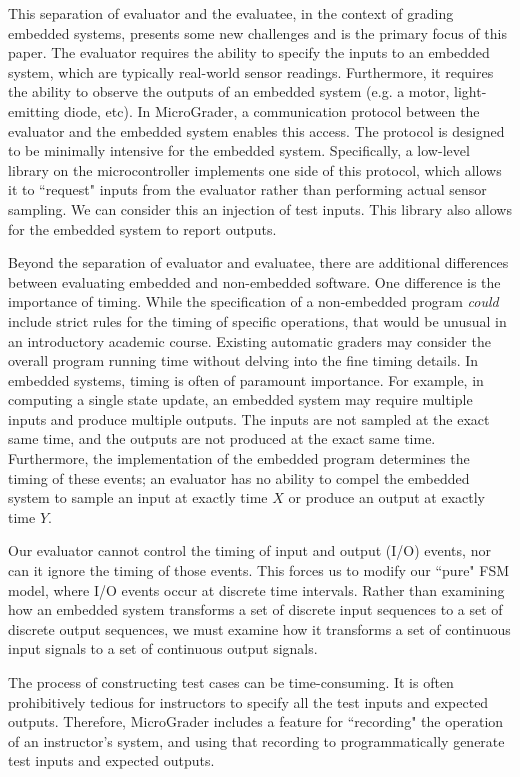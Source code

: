 \documentclass[12pt]{article}
\begin{document}
This separation of evaluator and the evaluatee, in the context of grading embedded systems, presents some new challenges and is the primary focus of this paper.  The evaluator requires the ability to specify the inputs to an embedded system, which are typically real-world sensor readings.  Furthermore, it requires the ability to observe the outputs of an embedded system (e.g. a motor, light-emitting diode, etc).  In MicroGrader, a communication protocol between the evaluator and the embedded system enables this access.  The protocol is designed to be minimally intensive for the embedded system.  Specifically, a low-level library on the microcontroller implements one side of this protocol, which allows it to ``request" inputs from the evaluator rather than performing actual sensor sampling.  We can consider this an injection of test inputs.  This library also allows for the embedded system to report outputs.

Beyond the separation of evaluator and evaluatee, there are additional differences between evaluating embedded and non-embedded software.  One difference is the importance of timing.  While the specification of a non-embedded program \textit{could} include strict rules for the timing of specific operations, that would be unusual in an introductory academic course.  Existing automatic graders may consider the overall program running time without delving into the fine timing details. In embedded systems, timing is often of paramount importance.  For example, in computing a single state update, an embedded system may require multiple inputs and produce multiple outputs.  The inputs are not sampled at the exact same time, and the outputs are not produced at the exact same time.  Furthermore, the implementation of the embedded program determines the timing of these events; an evaluator has no ability to compel the embedded system to sample an input at exactly time $X$ or produce an output at exactly time $Y$.

Our evaluator cannot control the timing of input and output (I/O) events, nor can it ignore the timing of those events.  This forces us to modify our ``pure" FSM model, where I/O events occur at discrete time intervals.  Rather than examining how an embedded system transforms a set of discrete input sequences to a set of discrete output sequences, we must examine how it transforms a set of continuous input signals to a set of continuous output signals.

The process of constructing test cases can be time-consuming.  It is often prohibitively tedious for instructors to specify all the test inputs and expected outputs.  Therefore, MicroGrader includes a feature for ``recording" the operation of an instructor's system, and using that recording to programmatically generate test inputs and expected outputs. 
\end{document}
